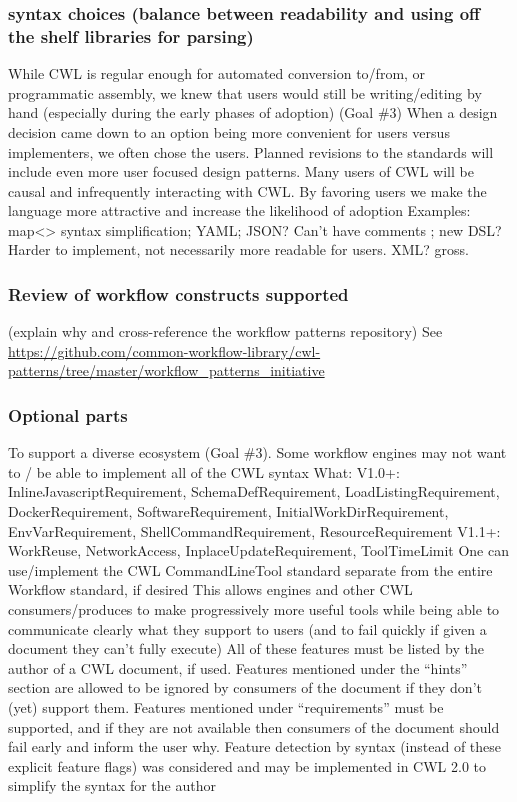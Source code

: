 \subsubsection{syntax choices (balance between readability and using off the shelf libraries for parsing)}
While CWL is regular enough for automated conversion to/from, or programmatic assembly, we knew that users would still be writing/editing by hand (especially during the early phases of adoption) (Goal \#3)
When a design decision came down to an option being more convenient for users versus implementers, we often chose the users. Planned revisions to the standards will include even more user focused design patterns.
Many users of CWL will be causal and infrequently interacting with CWL. By favoring users we make the language more attractive and increase the likelihood of adoption
Examples: map<> syntax simplification; YAML;
JSON? Can’t have comments ; new DSL? Harder to implement, not necessarily more readable for users. XML? gross.

\subsubsection{Review of workflow constructs supported}
(explain why and cross-reference the workflow patterns repository) See \url{https://github.com/common-workflow-library/cwl-patterns/tree/master/workflow_patterns_initiative}

\subsubsection{Optional parts}

To support a diverse ecosystem (Goal \#3). Some workflow engines may not want to / be able to implement all of the CWL syntax
What:
V1.0+: InlineJavascriptRequirement, SchemaDefRequirement, LoadListingRequirement, DockerRequirement, SoftwareRequirement, InitialWorkDirRequirement, EnvVarRequirement, ShellCommandRequirement, ResourceRequirement
V1.1+: WorkReuse, NetworkAccess, InplaceUpdateRequirement, ToolTimeLimit
One can use/implement the CWL CommandLineTool standard separate from the entire Workflow standard, if desired
This allows engines and other CWL consumers/produces to make progressively more useful tools while being able to communicate clearly what they support to users (and to fail quickly if given a document they can’t fully execute)
All of these features must be listed by the author of a CWL document, if used. Features mentioned under the “hints” section are allowed to be ignored by consumers of the document if they don’t (yet) support them. Features mentioned under “requirements” must be supported, and if they are not available then consumers of the document should fail early and inform the user why.
Feature detection by syntax (instead of these explicit feature flags) was considered and may be implemented in CWL 2.0 to simplify the syntax for the author

